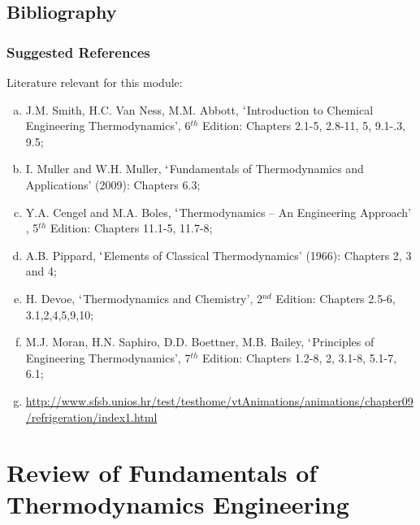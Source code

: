 \documentclass[10pt,compress]{beamer}
\begin{document}
 \subsection{Bibliography} 
   \begin{frame}
     \frametitle{Suggested References}
       Literature relevant for this module:
     \begin{enumerate}[(a)]
       \item J.M. Smith, H.C. Van Ness, M.M. Abbott, $\lq$Introduction to Chemical Engineering Thermodynamics', 6$^{th}$ Edition: Chapters 2.1-5, 2.8-11, 5, 9.1-.3, 9.5;
       \item I. Muller and W.H. Muller, $\lq$Fundamentals of Thermodynamics and Applications' (2009): Chapters 6.3;
       \item Y.A. Cengel and M.A. Boles, $\lq$Thermodynamics -- An Engineering Approach' , 5$^{th}$ Edition: Chapters 11.1-5, 11.7-8;
       \item A.B. Pippard, $\lq$Elements of Classical Thermodynamics' (1966): Chapters 2, 3 and 4;
       \item H. Devoe, $\lq$Thermodynamics and Chemistry', 2$^{nd}$ Edition: Chapters 2.5-6, 3.1,2,4,5,9,10;
       \item M.J. Moran, H.N. Saphiro, D.D. Boettner, M.B. Bailey, $\lq$Principles of Engineering Thermodynamics', 7$^{th}$ Edition: Chapters 1.2-8, 2, 3.1-8, 5.1-7, 6.1;
      \item \href{http://www.sfsb.unios.hr/test/testhome/vtAnimations/animations/chapter09/refrigeration/index1.html}{\tiny{http://www.sfsb.unios.hr/test/testhome/vtAnimations/animations/chapter09/refrigeration/index1.html}}
     \end{enumerate}
\end{frame}


 \section{Review of Fundamentals of Thermodynamics Engineering}
\end{document}
